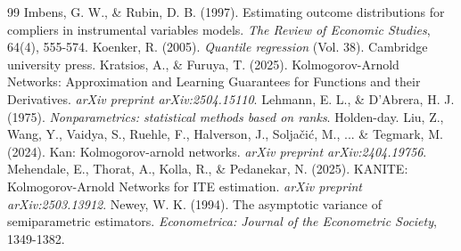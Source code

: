 \documentclass[final,3p,fleqn, 10pt]{elsarticle}
\begin{document}
\begin{thebibliography}{99}
 Imbens, G. W., \& Rubin, D. B. (1997). Estimating outcome distributions for compliers in instrumental variables models. \textit{The Review of Economic Studies}, 64(4), 555-574.
 Koenker, R. (2005). \textit{Quantile regression} (Vol. 38). Cambridge university press.
 Kratsios, A., \& Furuya, T. (2025). Kolmogorov-Arnold Networks: Approximation and Learning Guarantees for Functions and their Derivatives. \textit{arXiv preprint arXiv:2504.15110}.
 Lehmann, E. L., \& D'Abrera, H. J. (1975). \textit{Nonparametrics: statistical methods based on ranks}. Holden-day.
 Liu, Z., Wang, Y., Vaidya, S., Ruehle, F., Halverson, J., Solja{\v{c}}i{\'c}, M., ... \& Tegmark, M. (2024). Kan: Kolmogorov-arnold networks. \textit{arXiv preprint arXiv:2404.19756}.
 Mehendale, E., Thorat, A., Kolla, R., \& Pedanekar, N. (2025). KANITE: Kolmogorov-Arnold Networks for ITE estimation. \textit{arXiv preprint arXiv:2503.13912}.
 Newey, W. K. (1994). The asymptotic variance of semiparametric estimators. \textit{Econometrica: Journal of the Econometric Society}, 1349-1382.
\end{thebibliography}
\end{document}
